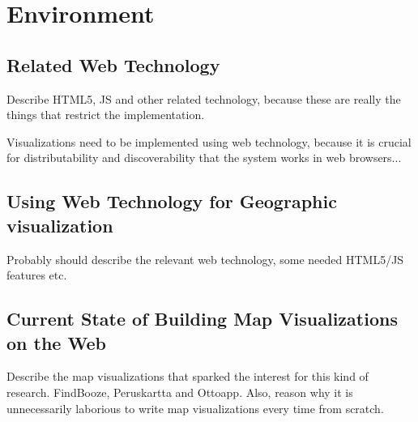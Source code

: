 
\chapter{Environment}
\label{chapter:environment}


\section{Related Web Technology}

Describe HTML5, JS and other related technology, because these are really the things that restrict the implementation.

Visualizations need to be implemented using web technology, because it is crucial for distributability and discoverability that the system works in web browsers... 

\section{Using Web Technology for Geographic visualization}

Probably should describe the relevant web technology, some needed HTML5/JS features etc. 

\section{Current State of Building Map Visualizations on the Web} %

Describe the map visualizations that sparked the interest for this kind of research. FindBooze, Peruskartta and Ottoapp. Also, reason why it is unnecessarily laborious to write map visualizations every time from scratch. 




